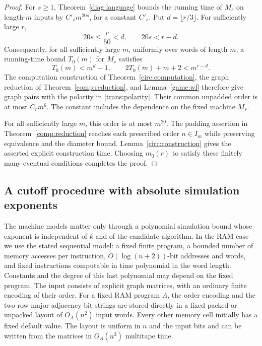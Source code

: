 \begin{proof}
For $s\ge1$, Theorem~\ref{diag:language} bounds the running time of $M_s$
on length-$m$ inputs by $C'_s m^{20s}$, for a constant $C'_s$. Put
$d=\lfloor r/3\rfloor$. For sufficiently large $r$,
\[
  20s\le\frac{r}{50}<d,
  \qquad
  20s<r-d.
\]
Consequently, for all sufficiently large $m$, uniformly over words of
length $m$, a running-time bound $T_0(m)$ for $M_s$ satisfies
\[
  T_0(m)<m^d-1,
  \qquad
  2T_0(m)+m+2<m^{r-d}.
\]
The computation construction of Theorem~\ref{circ:computation}, the graph
reduction of Theorem~\ref{comp:reduction}, and
Lemma~\ref{game:wl} therefore give graph pairs with the polarity in
\eqref{trans:polarity}. Their common unpadded order is at most $C_r m^6$.
The constant includes the dependence on the fixed machine $M_s$.

For all sufficiently large $m$, this order is at most $m^{20}$. The
padding assertion in Theorem~\ref{comp:reduction} reaches each prescribed
order $n\in I_m$ while preserving equivalence and the diameter bound.
Lemma~\ref{circ:construction} gives the asserted explicit construction
time. Choosing $m_0(r)$ to satisfy these finitely many eventual conditions
completes the proof.
\end{proof}

\subsection{A cutoff procedure with absolute simulation exponents}

The machine models matter only through a polynomial simulation bound whose
exponent is independent of $k$ and of the candidate algorithm. In the RAM
case we use the stated sequential model: a fixed finite program, a bounded
number of memory accesses per instruction, $O(\log(n+2))$-bit addresses and
words, and fixed instructions computable in time polynomial in the word
length. Constants and the degree of this last polynomial may depend on the
fixed program. The input consists of explicit graph matrices, with an
ordinary finite encoding of their order. For a fixed RAM program $A$,
the order encoding and the two row-major adjacency bit strings are stored
directly in a fixed packed or unpacked layout of $O_A(n^2)$ input words.
Every other memory cell initially has a fixed default value. The layout
is uniform in $n$ and the input bits and can be written from the matrices
in $O_A(n^3)$ multitape time.


